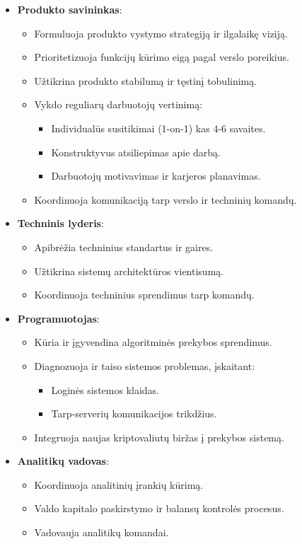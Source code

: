 \documentclass[]{VUMIFTemplateClass}
\begin{document}
\begin{itemize}
\item \textbf{Produkto savininkas}:
\begin{itemize}
\item Formuluoja produkto vystymo strategiją ir ilgalaikę viziją.
\item Prioritetizuoja funkcijų kūrimo eigą pagal verslo poreikius.
\item Užtikrina produkto stabilumą ir tęstinį tobulinimą.
\item Vykdo reguliarų darbuotojų vertinimą:
\begin{itemize}
\item Individualūs susitikimai (1-on-1) kas 4-6 savaites.
\item Konstruktyvus atsiliepimas apie darbą.
\item Darbuotojų motivavimas ir karjeros planavimas.
\end{itemize}
\item Koordinuoja komunikaciją tarp verslo ir techninių komandų.
\end{itemize}

\item \textbf{Techninis lyderis}:
\begin{itemize}
\item Apibrėžia techninius standartus ir gaires.
\item Užtikrina sistemų architektūros vientisumą.
\item Koordinuoja techninius sprendimus tarp komandų.
\end{itemize}

\item \textbf{Programuotojas}:
\begin{itemize}
\item Kūria ir įgyvendina algoritminės prekybos sprendimus.
\item Diagnozuoja ir taiso sistemos problemas, įskaitant:
\begin{itemize}
\item Loginės sistemos klaidas.
\item Tarp-serverių komunikacijos trikdžius.
\end{itemize}
\item Integruoja naujas kriptovaliutų biržas į prekybos sistemą.
\end{itemize}

\item \textbf{Analitikų vadovas}:
\begin{itemize}
\item Koordinuoja analitinių įrankių kūrimą.
\item Valdo kapitalo paskirstymo ir balansų kontrolės procesus.
\item Vadovauja analitikų komandai.
\end{itemize}


\end{itemize}
\end{document}
